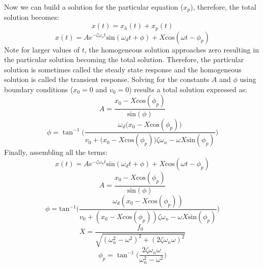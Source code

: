 \documentclass[12pt,letter]{article}
\numberwithin{ex}{section} %
\numberwithin{re}{section} %
\numberwithin{pr}{section} %
\begin{document}
			Now we can build a solution for the particular equation ($x_p$), therefore, the total solution becomes:
			\begin{equation}
				x(t) = x_h(t) + x_p(t)
			\end{equation}
			\begin{equation}
				x(t) = Ae^{-\zeta \omega_n t}\text{sin}(\omega_d t + \phi) +  X \text{cos}(\omega t - \phi_p)
			\end{equation}				
			Note for larger values of $t$, the homogeneous solution approaches zero resulting in the particular solution becoming the total solution. Therefore, the particular solution is sometimes called the steady state response and the homogeneous solution is called the transient response. Solving for the constants $A$ and $\phi$ using boundary conditions ($x_0=0$ and $v_0=0$) results a total solution expressed as:
			\begin{equation}
				A = \frac{x_0 -X \text{cos}(\phi_p)}{\text{sin}(\phi)}
			\end{equation}			 
			\begin{equation}
				\phi =  \tan^{-1} \bigg(\frac{\omega_d \big( x_0 -X \text{cos}(\phi_p)\big)}{v_0 + \big(x_0 - X \text{cos}(\phi_p)\big) \zeta \omega_n - \omega X \text{sin}(\phi_p) }\bigg)
			\end{equation}			
			Finally, assembling all the terms:
			\begin{equation}
				x(t) = Ae^{-\zeta \omega_n t}\text{sin}(\omega_d t + \phi) +  X \text{cos}(\omega t - \phi_p)
				\label{eq:damped_forced_x}
			\end{equation}
			\begin{equation}
				A = \frac{x_0 -X \text{cos}(\phi_p)}{\text{sin}(\phi)}
			\end{equation}			 
			\begin{equation}
				\phi =  \text{tan}^{-1}\bigg(\frac{\omega_d ( x_0 -X \text{cos}(\phi_p))}{v_0 + (x_0 - X \text{cos}(\phi_p)) \zeta \omega_n - \omega X \text{sin}(\phi_p) }\bigg)
			\end{equation}	
			\begin{equation}
				X = \frac{f_0}{\sqrt{(\omega_n^2 - \omega^2)^2 +  (2\zeta \omega_n \omega)^2}} 
			\end{equation}	
			\begin{equation}
				\phi_p = \tan^{-1} \bigg(\frac{2\zeta \omega_n \omega}{\omega_n^2 - \omega^2}\bigg)
				\label{eq:damped_forced_theta_p}
			\end{equation}		
\end{document}
